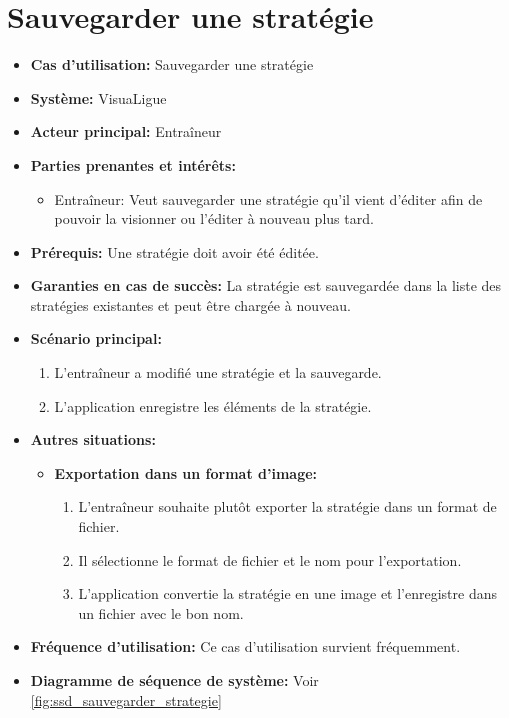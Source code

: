 \section{Sauvegarder une stratégie}
\label{sec:exporter_une_strategie}
\begin{itemize}
    \item \textbf{Cas d'utilisation:} Sauvegarder une strat\'egie
    \item \textbf{Syst\`eme:} VisuaLigue
    \item \textbf{Acteur principal:} Entra\^ineur
    \item \textbf{Parties prenantes et int\'er\^ets:}
        \begin{itemize}
            \item Entraîneur: Veut sauvegarder une stratégie qu'il vient d'éditer afin de pouvoir la visionner ou l'éditer à nouveau plus tard.
        \end{itemize}
    \item \textbf{Pr\'erequis:} Une stratégie doit avoir été éditée.
    \item \textbf{Garanties en cas de succ\`es:} La stratégie est sauvegardée dans la liste des stratégies existantes et peut être chargée à nouveau.
    \item \textbf{Sc\'enario principal:}
        \begin{enumerate}
            \item L'entra\^ineur a modifié une strat\'egie et la sauvegarde.
            \item L'application enregistre les \'el\'ements de la strat\'egie.
        \end{enumerate}
    \item \textbf{Autres situations:}
        \begin{itemize}
            \item \textbf{Exportation dans un format d'image:}
                \begin{enumerate}
                    \item L'entra\^ineur souhaite plut\^ot exporter la strat\'egie dans un format de fichier.
                    \item Il s\'electionne le format de fichier et le nom pour l'exportation.
                    \item L'application convertie la strat\'egie en une image et l'enregistre dans un fichier avec le bon nom.
                \end{enumerate}
        \end{itemize}
    \item \textbf{Fréquence d'utilisation:} Ce cas d'utilisation survient fréquemment.
    \item \textbf{Diagramme de s\'equence de syst\`eme:} Voir \ref{fig:ssd_sauvegarder_strategie}
\end{itemize}

